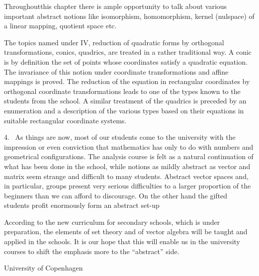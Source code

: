 Throughout\pageoriginale this chapter there is ample opportunity to
talk about various important abstract notions like isomorphism,
homomorphism, kernel (nulspace) of a linear mapping, quotient space etc.

The topics named under IV, reduction of quadratic forms by orthogonal
transformations, conics, quadrics, are treated in a rather traditional
way. A conic is by definition the set of points whose coordinates
satisfy a quadratic equation. The invariance of this notion under
coordinate transformations and affine mappings is proved. The
reduction of the equation in rectangular coordinates by orthogonal
coordinate transformations leads to one of the types known to the
students from the school. A similar treatment of the quadrics is
preceded by an enumeration and a description of the various types
based on their equations in suitable rectangular coordinate systems.

4.~ As things are now, most of our students come to the university
with the impression or even conviction that mathematics has only to do
with numbers and geometrical configurations. The analysis course is
felt as a natural continuation of what has been done in the school,
while notions as mildly abstract as vector and matrix seem strange and
difficult to many students. Abstract vector spaces and, in particular,
groups present very serious difficulties to a larger proportion of the
beginners than we can afford to discourage. On the other hand the
gifted students profit enormously form an abstract set-up

According to the new curriculum for secondary schools, which is under
preparation, the elements of set theory and of vector algebra will be
taught and applied in the schools. It is our hope that this will
enable us in the university courses to shift the emphasis more to the
``abstract'' side. 

\bigskip
\bigskip

\noindent
{\fontsize{9pt}{11pt}\selectfont
University of Copenhagen}\relax
